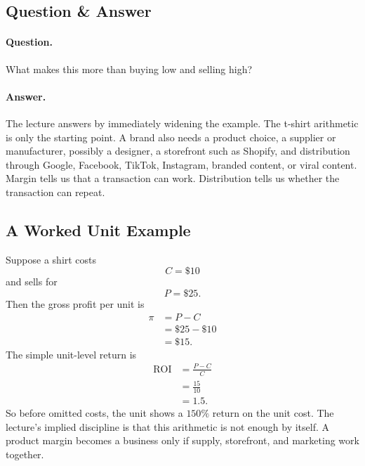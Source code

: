\subsection{Question \& Answer}

\paragraph{Question.}
What makes this more than buying low and selling high?

\paragraph{Answer.}
The lecture answers by immediately widening the example. The t-shirt arithmetic is only the starting point. A brand also needs a product choice, a supplier or manufacturer, possibly a designer, a storefront such as Shopify, and distribution through Google, Facebook, TikTok, Instagram, branded content, or viral content. Margin tells us that a transaction can work. Distribution tells us whether the transaction can repeat.

\subsection{A Worked Unit Example}

Suppose a shirt costs
\begin{equation}
C=\$10
\end{equation}
and sells for
\begin{equation}
P=\$25.
\end{equation}
Then the gross profit per unit is
\begin{align}
\pi &= P-C\\
&= \$25-\$10\\
&= \$15.
\end{align}
The simple unit-level return is
\begin{align}
\mathrm{ROI}
&= \frac{P-C}{C}\\
&= \frac{15}{10}\\
&= 1.5.
\end{align}
So before omitted costs, the unit shows a \(150\%\) return on the unit cost. The lecture's implied discipline is that this arithmetic is not enough by itself. A product margin becomes a business only if supply, storefront, and marketing work together.

